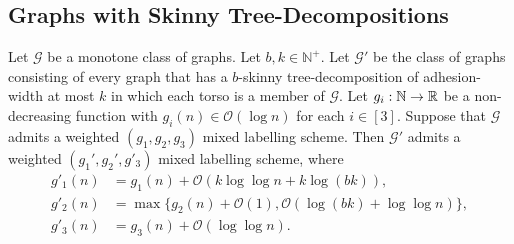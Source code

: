 \documentclass{patmorin}
\newcommand{\NN}{\mathbb{N}}
\newcommand{\Oh}{\mathcal{O}}
\begin{document}
\subsection{Graphs with Skinny Tree-Decompositions}

  \begin{lem}\label{skinny_labelling}
    Let $\mathcal{G}$ be a monotone class of graphs.
    Let $b, k\in\NN^+$.
    Let $\mathcal{G}'$ be the class of graphs consisting of every graph that has a $b$-skinny tree-decomposition of adhesion-width at most $k$ in which each torso is a member of $\mathcal{G}$.
    Let $g_i:\mathbb{N}\to\mathbb{R}$ be a non-decreasing function with $g_i(n)\in \Oh(\log n)$ for each $i\in[3]$.
    Suppose that $\mathcal{G}$ admits a weighted $(g_1,g_2,g_3)$ mixed labelling scheme.
    Then $\mathcal{G}'$ admits a weighted $(g_1',g_2',g'_3)$ mixed labelling scheme, where
    \begin{align*}
     g'_1(n) & = g_1(n) + \Oh(k\log\log n + k\log (bk)),  \\
     g'_2(n) & = \max\{g_2(n)+\Oh(1), \Oh(\log(bk)+\log\log n)\}, \\
     g'_3(n) & = g_3(n) + \Oh(\log\log n) .
     \end{align*}
  \end{lem}
\end{document}
